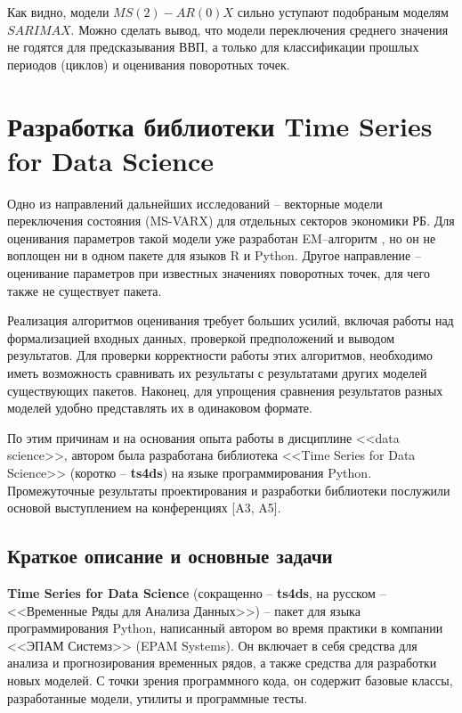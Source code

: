 \documentclass[a4paper,14pt]{extreport}
\begin{document}
	
	Как видно, модели $MS(2)-AR(0)X$ сильно уступают подобраным моделям $SARIMAX$. Можно сделать вывод, что модели переключения среднего значения не годятся для предсказывания ВВП, а только для классификации прошлых периодов (циклов) и оценивания поворотных точек.
	
	
	\chapter{Разработка библиотеки Time Series for Data Science}
	
	Одно из направлений дальнейших исследований -- векторные модели переключения состояния (MS-VARX) для отдельных секторов экономики РБ. Для оценивания параметров такой модели уже разработан EM--алгоритм \cite{malNovopMSVARX}, но он не воплощен ни в одном пакете для языков R и Python. Другое направление -- оценивание параметров при известных значениях поворотных точек, для чего также не существует пакета.
	
	Реализация алгоритмов оценивания требует больших усилий, включая работы над формализацией входных данных, проверкой предположений и выводом результатов. Для проверки корректности работы этих алгоритмов, необходимо иметь возможность сравнивать их результаты с результатами других моделей существующих пакетов. Наконец, для упрощения сравнения результатов разных моделей удобно представлять их в одинаковом формате.
	
	По этим причинам и на основания опыта работы в дисциплине <<data science>>, автором была разработана библиотека <<Time Series for Data Science>> (коротко -- \textbf{ts4ds}) на языке программирования Python. Промежуточные результаты проектирования и разработки библиотеки послужили основой выступлением на конференциях [A3, A5].
	
	\section{Краткое описание и основные задачи}
	
	\textbf{Time Series for Data Science} (сокращенно -- \textbf{ts4ds}, на русском -- <<Временные Ряды для Анализа Данных>>) -- пакет для языка программирования Python, написанный автором во время практики в компании <<ЭПАМ Системз>> (EPAM Systems). Он включает в себя средства для анализа и прогнозирования временных рядов, а также средства для разработки новых моделей. С точки зрения программного кода, он содержит базовые классы, разработанные модели, утилиты и программные тесты.
	
\end{document}
